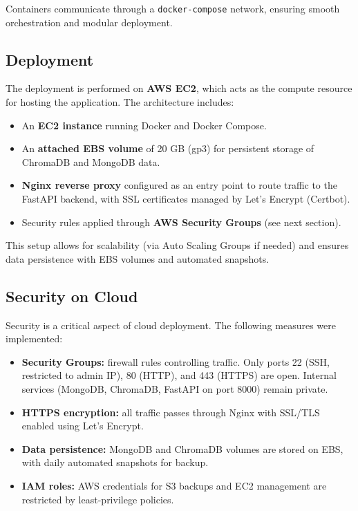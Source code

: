 Containers communicate through a \texttt{docker-compose} network,
ensuring smooth orchestration and modular deployment.

\subsection{Deployment}
The deployment is performed on \textbf{AWS EC2}, which acts as the
compute resource for hosting the application. The architecture
includes:
\begin{itemize}
    \item An \textbf{EC2 instance} running Docker and Docker Compose.
    \item An \textbf{attached EBS volume} of 20 GB (gp3) for persistent
    storage of ChromaDB and MongoDB data.
    \item \textbf{Nginx reverse proxy} configured as an entry point to
    route traffic to the FastAPI backend, with SSL certificates managed
    by Let’s Encrypt (Certbot).
    \item Security rules applied through \textbf{AWS Security Groups}
    (see next section).
\end{itemize}

This setup allows for scalability (via Auto Scaling Groups if needed)
and ensures data persistence with EBS volumes and automated
snapshots.

\subsection{Security on Cloud}
Security is a critical aspect of cloud deployment. The following
measures were implemented:
\begin{itemize}
    \item \textbf{Security Groups:} firewall rules controlling traffic. Only
    ports 22 (SSH, restricted to admin IP), 80 (HTTP), and 443 (HTTPS)
    are open. Internal services (MongoDB, ChromaDB, FastAPI on port
    8000) remain private.
    \item \textbf{HTTPS encryption:} all traffic passes through Nginx with
    SSL/TLS enabled using Let’s Encrypt.
    \item \textbf{Data persistence:} MongoDB and ChromaDB volumes are
    stored on EBS, with daily automated snapshots for backup.
    \item \textbf{IAM roles:} AWS credentials for S3 backups and EC2
    management are restricted by least-privilege policies.
\end{itemize}

